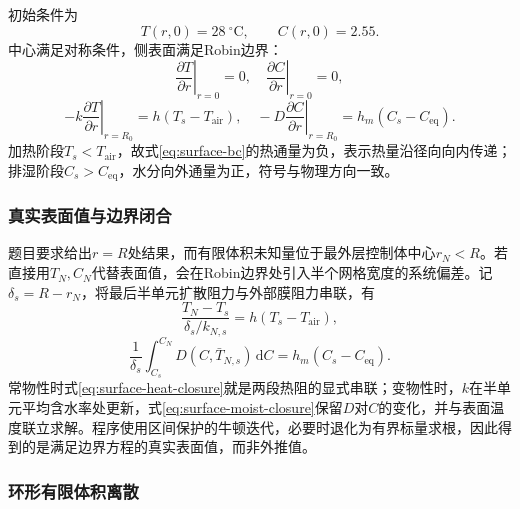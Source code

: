初始条件为
\begin{equation}
 T(r,0)=28\ ^\circ\mathrm C,\qquad C(r,0)=2.55.
 \label{eq:initial}
\end{equation}
中心满足对称条件，侧表面满足Robin边界：
\begin{equation}
 \left.\frac{\partial T}{\partial r}\right|_{r=0}=0,
 \quad
 \left.\frac{\partial C}{\partial r}\right|_{r=0}=0,
 \label{eq:center-bc}
\end{equation}
\begin{equation}
 -k\left.\frac{\partial T}{\partial r}\right|_{r=R_0}
 =h(T_s-T_{\mathrm{air}}),
 \quad
 -D\left.\frac{\partial C}{\partial r}\right|_{r=R_0}
 =h_m(C_s-C_{\mathrm{eq}}).
 \label{eq:surface-bc}
\end{equation}
加热阶段$T_s<T_{\mathrm{air}}$，故式\eqref{eq:surface-bc}的热通量为负，表示热量沿径向向内传递；排湿阶段$C_s>C_{\mathrm{eq}}$，水分向外通量为正，符号与物理方向一致。

\subsubsection{真实表面值与边界闭合}

题目要求给出$r=R$处结果，而有限体积未知量位于最外层控制体中心$r_N<R$。若直接用$T_N,C_N$代替表面值，会在Robin边界处引入半个网格宽度的系统偏差。记$\delta_s=R-r_N$，将最后半单元扩散阻力与外部膜阻力串联，有
\begin{equation}
\frac{T_N-T_s}{\delta_s/k_{N,s}}=h(T_s-T_{\mathrm{air}}),
\label{eq:surface-heat-closure}
\end{equation}
\begin{equation}
\frac{1}{\delta_s}\int_{C_s}^{C_N}D(C,\bar T_{N,s})\,\mathrm dC
=h_m(C_s-C_{\mathrm{eq}}).
\label{eq:surface-moist-closure}
\end{equation}
常物性时式\eqref{eq:surface-heat-closure}就是两段热阻的显式串联；变物性时，$k$在半单元平均含水率处更新，式\eqref{eq:surface-moist-closure}保留$D$对$C$的变化，并与表面温度联立求解。程序使用区间保护的牛顿迭代，必要时退化为有界标量求根，因此得到的是满足边界方程的真实表面值，而非外推值。

\subsubsection{环形有限体积离散}

